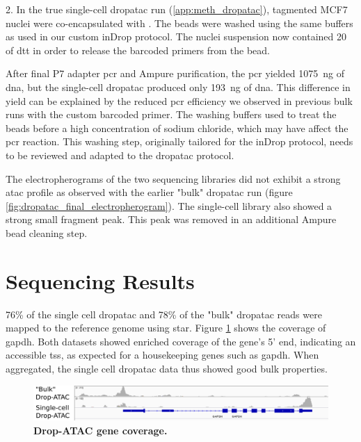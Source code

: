 2. In the true single-cell \acrshort{dropatac} run (\ref{app:meth_dropatac}), tagmented MCF7 nuclei were co-encapsulated with . The beads were washed using the same buffers as used in our custom inDrop protocol. The nuclei suspension now contained \SI{20}{\milli\molar} of \acrshort{dtt} in order to release the barcoded primers from the bead.\pms

After final P7 adapter \acrshort{pcr} and Ampure purification, the \acrshort{pcr} yielded \SI{1075}{\ng} of \acrshort{dna}, but the single-cell \acrshort{dropatac} produced only \SI{193}{\ng} of \acrshort{dna}. This difference in yield can be explained by the reduced \acrshort{pcr} efficiency we observed in previous bulk runs with the custom barcoded primer. The washing buffers used to treat the beads before a high concentration of sodium chloride, which may have affect the \acrshort{pcr} reaction. This washing step, originally tailored for the inDrop protocol, needs to be reviewed and adapted to the \acrshort{dropatac} protocol.\pms

The electropherograms of the two sequencing libraries did not exhibit a strong \acrshort{atac} profile as observed with the earlier "bulk" \acrshort{dropatac} run (figure \ref{fig:dropatac_final_electropherogram}). The single-cell library also showed a strong small fragment peak. This peak was removed in an additional Ampure bead cleaning step.\pms

\section{Sequencing Results}
76\% of the single cell \acrshort{dropatac} and 78\% of the "bulk" \acrshort{dropatac} reads were mapped to the reference genome using \acrshort{star}. Figure \ref{fig:dropatac_igv} shows the coverage of \acrshort{gapdh}. Both datasets showed enriched coverage of the gene's 5' end, indicating an accessible \acrshort{tss}, as expected for a housekeeping genes such as \acrshort{gapdh}. When aggregated, the single cell \acrshort{dropatac} data thus showed good bulk properties.\pms

\begin{figure}[ht]
\centerfloat
\includegraphics[width=\textwidth]{./ims/dropatac_igv.png}
\caption[Drop-ATAC gene coverage]{\textbf{Drop-ATAC gene coverage.}}
\label{fig:dropatac_igv}
\end{figure}


